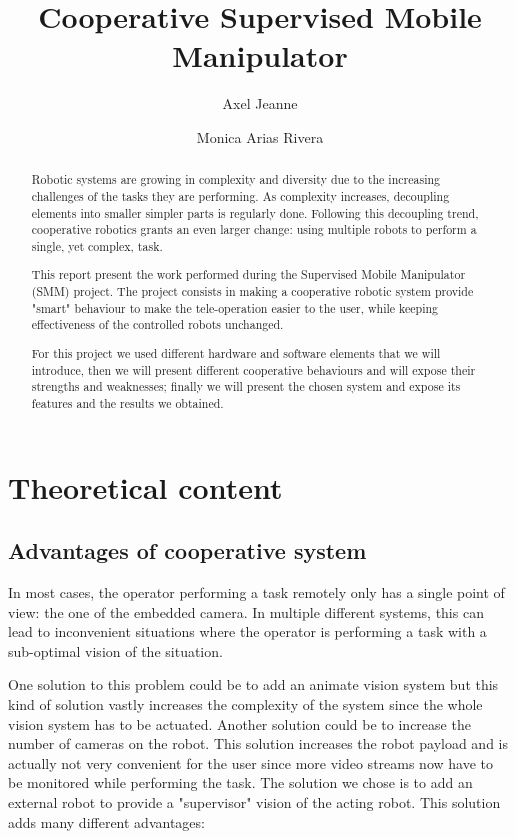 \documentclass[11pt,a4paper]{article}
\begin{document}
\pagestyle{headings}
\author{Axel Jeanne \and Monica Arias Rivera}
\title{Cooperative Supervised Mobile Manipulator}
\maketitle
\begin{abstract}
Robotic systems are growing in complexity and diversity due to the increasing challenges of the tasks
they are performing. As complexity increases, decoupling elements into smaller simpler parts is
regularly done. Following this decoupling trend, cooperative robotics grants an even 
larger change: using multiple robots to perform a single, yet complex, task.

This report present the work performed during the Supervised Mobile Manipulator (SMM) project.
The project consists in making a cooperative robotic system provide "smart" behaviour to
make the tele-operation easier to the user, while keeping effectiveness of the controlled robots 
unchanged.

For this project we used different hardware and software elements that we will introduce,
then we will present different cooperative behaviours and will expose their strengths and weaknesses; finally we will present the chosen system and expose its features and the results we obtained.
\end{abstract}
\clearpage

\tableofcontents

\clearpage
\section{Theoretical content}
\subsection{Advantages of cooperative system}
In most cases, the operator performing a task remotely only has a single point of view: the
one of the embedded camera. In multiple different systems, this can
lead to inconvenient situations where the operator is performing a task with a sub-optimal
vision of the situation.

One solution to this problem could be to add an animate vision system \cite{Ballard1991}
but this kind of solution vastly increases the complexity of the system since the whole vision system
has to be actuated. Another solution could be to increase the number of cameras on the robot.
This solution increases the robot payload and is actually not very convenient for the user
since more video streams now have to be monitored while performing the task. The solution we chose is to add an external robot to provide a "supervisor" vision of the acting robot. This solution adds many different  advantages:
\end{document}

